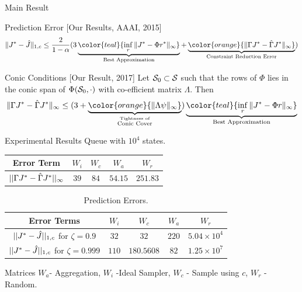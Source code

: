 \documentclass[10pt]{beamer}
\begin{document}
\begin{frame}[fragile]{Main Result}
\begin{block}{Prediction Error [Our Results, AAAI, 2015]}
\begin{align*}
\norm{J^*-\hj}_{1,c}\leq \frac{2}{1-\alpha}( 3\underbrace{\color{teal}{\inf_r\norm{J^*-\Phi r^*}_{\infty}}}_{\text{Best Approximation}}+ \underbrace{\color{orange}{\norm{\Gamma J^*-\hg J^*}_{\infty}}}_{\text{Constraint Reduction Error}})
\end{align*}
\end{block}

\begin{block}{Conic Conditions [Our Result, 2017]}
Let $\S_0\subset \S$ such that the rows of $\Phi$ lies in the conic span of $\Phi(\S_0,\cdot)$ with co-efficient matrix $\Lambda$. Then
\begin{align*}
\norm{ \Gamma J^*-\hg J^* }_{\infty}\leq (3+\underbrace{\color{orange}{\norm{\Lambda \psi}_{\infty}}}_{\stackrel{\text{Tightness of}}{\text{Conic Cover}}})\underbrace{\color{teal}{\inf_r\norm{J^*-\Phi r}_{
\infty}}}_{\text{Best Approximation}}
\end{align*}
\end{block}


\end{frame}


\begin{frame}[fragile]{Experimental Results}
Queue with $10^4$ states.
\begin{table}
\begin{tabular}{|c|c|c|c|c|}\hline
Error Term&     $W_i$&  $W_c$& $W_a$& $W_r$ \\\hline
$\et$ & $39$    &$84$& $54.15$& $251.83$ \\\hline
\end{tabular}
\end{table}

\begin{table}
\begin{center}
\begin{tabular}{|c|c|c|c|c|}\hline
Error Terms&    $W_i$&  $W_c$& $W_a$& $W_r$ \\\hline
$||J^*-\hj||_{1,c}$ for $\zeta=0.9$& $32$&      $32$& $220$& $5.04\times 10^4$ \\\hline
$||J^*-\hj||_{1,c}$ for $\zeta=0.999$& $110$&   $180.5608$& $82$& $1.25\times 10^7$ \\\hline
\end{tabular}
\end{center}
\caption*{Prediction Errors.}
\label{perf1}
\end{table}
\begin{block}{Matrices}
$W_a$- Aggregation, $W_i$ -Ideal Sampler, $W_c$ - Sample using $c$, $W_r$ - Random.
\end{block}
\end{frame}
\end{document}
